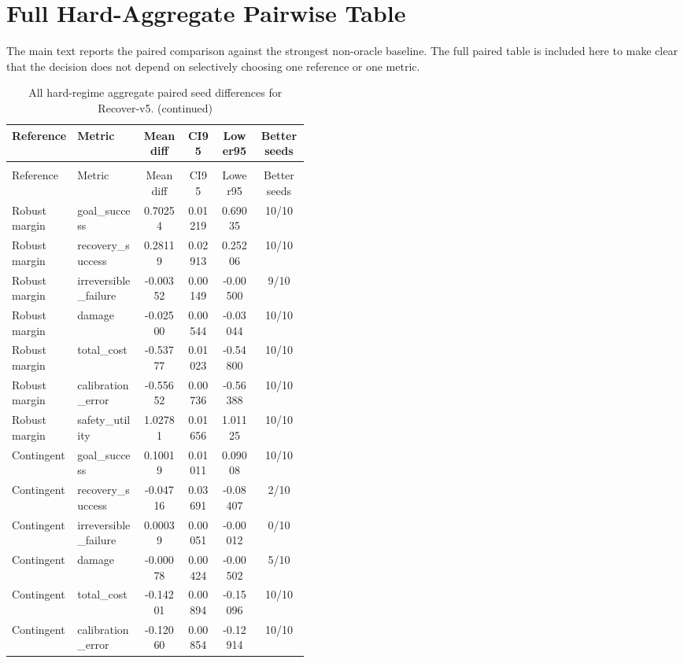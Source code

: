 \documentclass{article}
\begin{document}
\section{Full Hard-Aggregate Pairwise Table}

The main text reports the paired comparison against the strongest non-oracle baseline. The full paired table is included here to make clear that the decision does not depend on selectively choosing one reference or one metric.

\begin{center}
\scriptsize
\begin{longtable}{p{0.22\linewidth}p{0.22\linewidth}cccc}
\caption{All hard-regime aggregate paired seed differences for Recover-v5.}\label{tab:full-pairwise}\\
\toprule
Reference & Metric & Mean diff & CI95 & Lower95 & Better seeds\\
\midrule
\endfirsthead
\caption[]{All hard-regime aggregate paired seed differences for Recover-v5. (continued)}\\
\toprule
Reference & Metric & Mean diff & CI95 & Lower95 & Better seeds\\
\midrule
\endhead
Robust margin & goal\_success & 0.70254 & 0.01219 & 0.69035 & 10/10\\
Robust margin & recovery\_success & 0.28119 & 0.02913 & 0.25206 & 10/10\\
Robust margin & irreversible\_failure & -0.00352 & 0.00149 & -0.00500 & 9/10\\
Robust margin & damage & -0.02500 & 0.00544 & -0.03044 & 10/10\\
Robust margin & total\_cost & -0.53777 & 0.01023 & -0.54800 & 10/10\\
Robust margin & calibration\_error & -0.55652 & 0.00736 & -0.56388 & 10/10\\
Robust margin & safety\_utility & 1.02781 & 0.01656 & 1.01125 & 10/10\\
Contingent & goal\_success & 0.10019 & 0.01011 & 0.09008 & 10/10\\
Contingent & recovery\_success & -0.04716 & 0.03691 & -0.08407 & 2/10\\
Contingent & irreversible\_failure & 0.00039 & 0.00051 & -0.00012 & 0/10\\
Contingent & damage & -0.00078 & 0.00424 & -0.00502 & 5/10\\
Contingent & total\_cost & -0.14201 & 0.00894 & -0.15096 & 10/10\\
Contingent & calibration\_error & -0.12060 & 0.00854 & -0.12914 & 10/10\\

\end{longtable}
\end{center}
\end{document}
